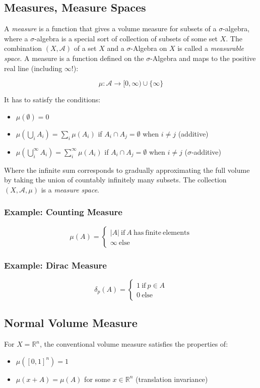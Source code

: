\subsection{Measures, Measure Spaces}
A \textit{measure} is a function that gives a volume measure for subsets of a $\sigma$-algebra, where a $\sigma$-algebra is a special sort of collection of subsets of some set $X$. 
The combination $(X,\mathscr{A})$ of a set $X$ and a $\sigma$-Algebra on $X$ is called a \textit{measurable space}. A measure is a function defined on the $\sigma$-Algebra and maps to the positive real line (including $\infty$!):

\begin{equation}
\mu: \mathscr{A} \rightarrow [0,\infty)\cup\{\infty\} 
\end{equation}

It has to satisfy the conditions:

\begin{itemize}
\item $\mu(\emptyset) = 0$
\item $\mu(\bigcup_i A_i) = \sum_i \mu(A_i)$ if $A_i \cap A_j = \emptyset$ when $i\neq j$ (additive)
\item $\mu(\bigcup^{\infty}_i A_i) = \sum^{\infty}_i \mu(A_i)$ if $A_i \cap A_j = \emptyset$ when $i\neq j$ ($\sigma$-additive) 
\end{itemize}

Where the infinite sum corresponds to gradually approximating the full volume by taking the union of countably infinitely many subsets. The collection $(X,\mathscr{A},\mu)$ is a \textit{measure space}.

\subsubsection{Example: Counting Measure}

\begin{equation}
\mu(A) = \left\{\begin{array}{l} |A| \mathrm{\ if\ }A\mathrm{\ has\ finite\ elements}\\ \infty\mathrm{\ else}\end{array}\right.
\end{equation}

\subsubsection{Example: Dirac Measure}
\begin{equation}
\delta_p(A) = \left\{\begin{array}{l} 1 \mathrm{\ if\ }p\in A\\ 0 \mathrm{\ else} \end{array}\right.
\end{equation}

\subsection{Normal Volume Measure}
For $X=\mathbb{R}^n$, the conventional volume measure satisfies the properties of:

\begin{itemize}
\item $\mu([0,1]^n) = 1$
\item $\mu(x + A) = \mu(A)$ for some $x\in \mathbb{R}^n$ (translation invariance)
\end{itemize}
